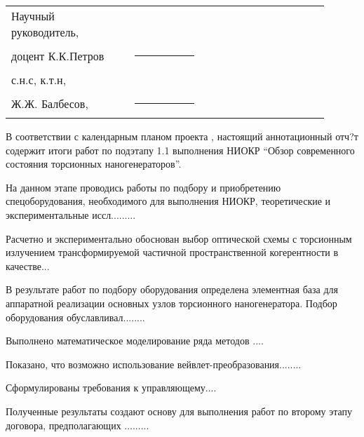 \documentclass[koi8-r,usehyperref,12pt]{G7-32}
\begin{document}

\frontmatter %



\Executors %
\begin{longtable}{p{0.35\linewidth}p{0.2\linewidth}p{0.35\linewidth}}
Научный руководитель, 	&		&	\\
доцент К.К.Петров	&\rule{1\linewidth}{0.1pt}	&  \\ \vspace{1cm}

с.н.с, к.т.н,  &		&	\\
Ж.Ж. Балбесов, & \rule{1\linewidth}{0.1pt}& \\
\end{longtable}

\Referat %
В соответствии с календарным планом проекта \No, настоящий аннотационный отч?т содержит итоги работ по подэтапу 1.1 выполнения НИОКР ``Обзор современного состояния торсионных наногенераторов''.

На данном этапе проводись работы по подбору и приобретению спецоборудования, необходимого для выполнения НИОКР, теоретические и экспериментальные иссл.........

Расчетно и экспериментально обоснован выбор оптической схемы с торсионным излучением трансформируемой частичной пространственной когерентности в качестве...

В результате работ по подбору оборудования определена элементная база для аппаратной реализации основных узлов торсионного наногенератора. Подбор оборудования обуславливал........

Выполнено математическое моделирование ряда методов .... 

Показано, что возможно использование вейвлет-преобразования........

Сформулированы требования к управляющему....

Полученные результаты создают основу для выполнения работ по второму этапу договора, предполагающих .........

\tableofcontents
\end{document}
